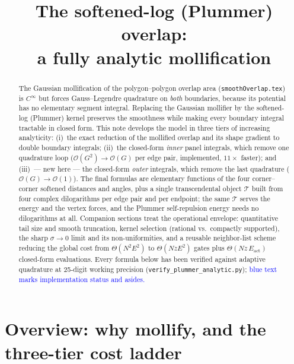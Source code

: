\documentclass[11pt]{article}
\title{The softened-log (Plummer) overlap:\\ a fully analytic mollification}
\author{}
\date{}
\newcommand{\aside}[1]{\textcolor{blue}{#1}}
\begin{document}
\maketitle

\begin{abstract}
\noindent The Gaussian mollification of the polygon--polygon overlap area
(\texttt{smoothOverlap.tex}) is $C^\infty$ but forces Gauss--Legendre quadrature on
\emph{both} boundaries, because its potential has no elementary segment integral.
Replacing the Gaussian mollifier by the softened-log (Plummer) kernel preserves the
smoothness while making every boundary integral tractable in closed form.  This note
develops the model in three tiers of increasing analyticity: (i)~the exact reduction of
the mollified overlap and its shape gradient to double boundary integrals; (ii)~the
closed-form \emph{inner} panel integrals, which remove one quadrature loop
($\mathcal O(G^2)\!\to\!\mathcal O(G)$ per edge pair, implemented, $11\times$ faster);
and (iii)~--- new here --- the closed-form \emph{outer} integrals, which remove the last
quadrature ($\mathcal O(G)\!\to\!\mathcal O(1)$).  The final formulas are elementary
functions of the four corner--corner softened distances and angles, plus a single
transcendental object $\mathcal T$ built from four complex dilogarithms per edge pair
and per endpoint; the same $\mathcal T$ serves the energy and the vertex forces, and
the Plummer self-repulsion energy needs no dilogarithms at all.  Companion sections
treat the operational envelope: quantitative tail size and smooth truncation, kernel
selection (rational vs.\ compactly supported), the sharp $\sigma\to0$ limit and its
non-uniformities, and a reusable neighbor-list scheme reducing the global cost from
$\Theta(N^2E^2)$ to $\Theta(NzE^2)$ gates plus $\Theta(Nz\,E_{\text{act}})$
closed-form evaluations.  Every formula below
has been verified against adaptive quadrature at 25-digit working precision
(\texttt{verify\_plummer\_analytic.py}); \aside{blue text marks implementation status
and asides.}
\end{abstract}

\tableofcontents

\section{Overview: why mollify, and the three-tier cost ladder}
\end{document}

